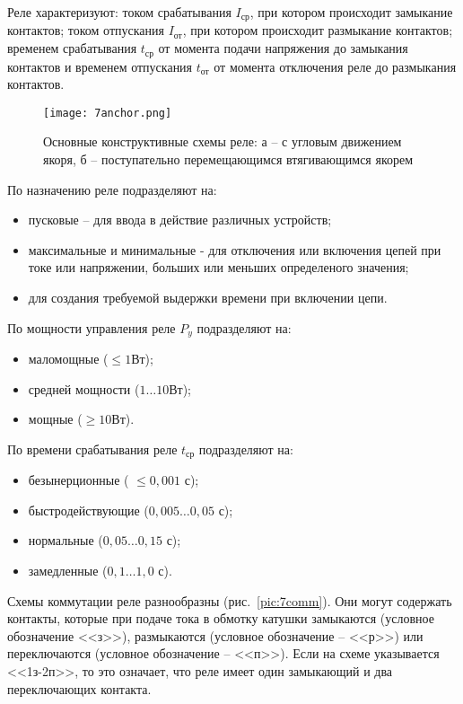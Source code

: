 Реле характеризуют: током срабатывания $ I_\text{ср} $, при котором происходит замыкание контактов; током отпускания $ I_\text{от} $, при котором происходит размыкание контактов; временем срабатывания $ t_\text{ср} $ от момента подачи напряжения до замыкания контактов и временем отпускания  $ t_\text{от} $ от момента отключения реле до размыкания контактов.

\begin{figure}[h!]
	\caption{ Основные конструктивные схемы реле: а -- с угловым движением якоря, б -- поступательно перемещающимся втягивающимся якорем }
	\texttt{[image: 7anchor.png]}
	\label{pic:7anchor}
\end{figure}

По назначению реле подразделяют на:
\begin{itemize}
\item пусковые -- для ввода в действие различных устройств;
\item максимальные и минимальные - для отключения или включения цепей при токе или напряжении, больших или меньших определеного значения;
\item для создания требуемой выдержки времени при включении цепи.
\end{itemize}

По мощности управления реле $ P_y $ подразделяют на:
\begin{itemize}
\item маломощные ($ \leq 1 \text{Вт} $);
\item средней мощности ($ 1 \ldots 10 \text{Вт} $);
\item мощные ($ \geq 10 \text{Вт} $).
\end{itemize}

По времени срабатывания реле $ t_\text{ср} $ подразделяют на:
\begin{itemize}
\item безынерционные ( $ \leq 0,001 $ с);
\item быстродействующие  ($ 0,005\ldots0,05 $ с);
\item нормальные ($ 0,05\ldots0,15 $ с);
\item замедленные ($ 0,1 \ldots 1,0 $ с).
\end{itemize}

Схемы коммутации реле разнообразны (рис.~\ref{pic:7comm}). Они могут содержать контакты, которые при подаче тока в обмотку катушки замыкаются (условное обозначение <<з>>), размыкаются (условное обозначение -- <<р>>) или переключаются (условное обозначение -- <<п>>). Если на схеме указывается <<1з-2п>>, то это означает, что реле имеет один замыкающий и два переключающих контакта.

